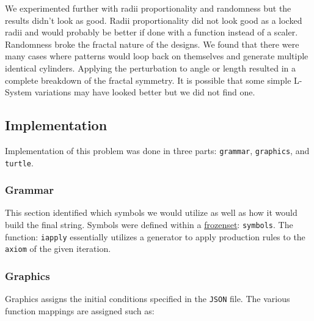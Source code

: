 We experimented further with radii proportionality and randomness but the 
results didn't look as good. Radii proportionality did not look good as a 
locked radii and would probably be better if done with a function instead of a 
scaler. Randomness broke the fractal nature of the designs. We found that there 
were many cases where patterns would loop back on themselves and generate 
multiple identical cylinders. Applying the perturbation to angle or length 
resulted in a complete breakdown of the fractal symmetry. It is possible that 
some simple L-System variations may have looked better but we did not find one.




\subsection{Implementation}\label{sec:l-sys-implementation}
Implementation of this problem was done in three parts: \texttt{grammar}, 
\texttt{graphics}, and \texttt{turtle}. 

\subsubsection{Grammar}
This section identified which symbols we would utilize as well as how it would 
build the final string. Symbols were defined within a 
\href{https://docs.python.org/3/library/stdtypes.html#frozenset}{frozenset}: 
\texttt{symbols}. The function: \texttt{iapply} essentially 
utilizes a generator to apply production rules to the \texttt{axiom} of the 
given iteration.

\subsubsection{Graphics}
Graphics assigns the initial conditions specified in the \texttt{JSON} file. 
The various function mappings are assigned such as:

